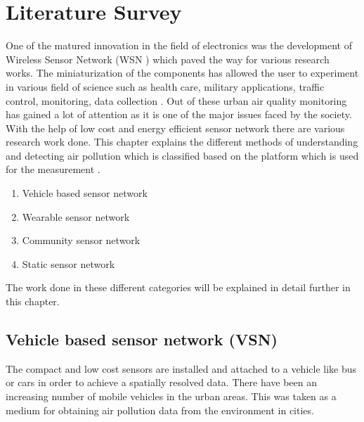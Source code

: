 \chapter{Literature Survey}

One of the matured innovation in the field of electronics was the development of Wireless Sensor Network (WSN ) which paved the way for various research works. The miniaturization of the components has allowed the user to experiment in various field of science such as health care, military applications, traffic control, monitoring, data collection \cite{Khedo2017} \cite{Liu2017}. Out of these urban air quality monitoring has gained a lot of attention as it is one of the major issues faced by the society. With the help of low cost and energy efficient sensor network there are various research work done. This chapter explains the different methods of understanding and detecting air pollution which is classified based on the platform which is used for the measurement\cite{Yi2015} \cite{Pavani2017}.

\begin{enumerate}

    \item Vehicle based sensor network
    \item Wearable sensor network
    \item Community sensor network
    \item Static sensor network

 \end{enumerate} 

 The work done in these different categories will be explained in detail further in this chapter.

\section{Vehicle based sensor network (VSN)}

The compact and low cost sensors are installed and attached to a vehicle like bus or cars in order to achieve a spatially resolved data. There have been an increasing number of mobile vehicles in the urban areas. This was taken as a medium for obtaining air pollution data from the environment in cities. 

